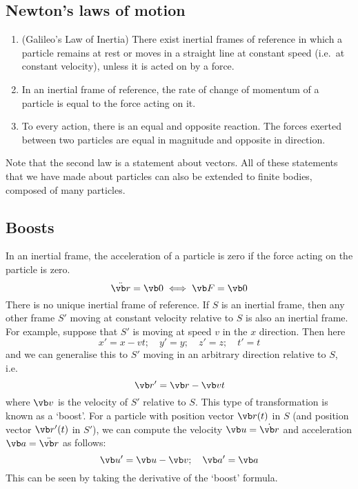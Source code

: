 \subsection{Newton's laws of motion}
\begin{enumerate}
	\item (Galileo's Law of Inertia) There exist inertial frames of reference in which a particle remains at rest or moves in a straight line at constant speed (i.e.\ at constant velocity), unless it is acted on by a force.
	\item In an inertial frame of reference, the rate of change of momentum of a particle is equal to the force acting on it.
	\item To every action, there is an equal and opposite reaction.
	      The forces exerted between two particles are equal in magnitude and opposite in direction.
\end{enumerate}
Note that the second law is a statement about vectors.
All of these statements that we have made about particles can also be extended to finite bodies, composed of many particles.

\subsection{Boosts}
In an inertial frame, the acceleration of a particle is zero if the force acting on the particle is zero.
\[
	\ddot{\vb r} = \vb 0 \iff \vb F = \vb 0
\]
There is no unique inertial frame of reference.
If \(S\) is an inertial frame, then any other frame \(S'\) moving at constant velocity relative to \(S\) is also an inertial frame.
For example, suppose that \(S'\) is moving at speed \(v\) in the \(x\) direction.
Then here
\[
	x'=x-vt;\quad y'=y;\quad z'=z;\quad t'=t
\]
and we can generalise this to \(S'\) moving in an arbitrary direction relative to \(S\), i.e.
\[
	\vb r' = \vb r - \vb v t
\]
where \(\vb v\) is the velocity of \(S'\) relative to \(S\).
This type of transformation is known as a `boost'.
For a particle with position vector \(\vb r(t)\) in \(S\) (and position vector \(\vb r'(t)\) in \(S'\)), we can compute the velocity \(\vb u = \dot{\vb r}\) and acceleration \(\vb a = \ddot{\vb r}\) as follows:
\[
	\vb u' = \vb u - \vb v;\quad \vb a' = \vb a
\]
This can be seen by taking the derivative of the `boost' formula.

